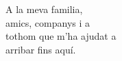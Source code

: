 \thispagestyle{empty}

\vfill

\begin{center}
    \sffamily
    A la meva familia,\\
    amics, companys i a \\
    tothom que m'ha ajudat a \\
    arribar fins aquí.
\end{center}

\vfill